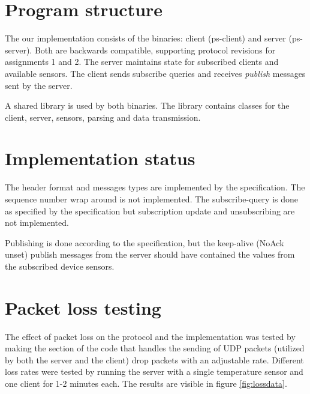 \documentclass[a4paper]{article}
\begin{document}


\tableofcontents
\newpage

\section{Program structure}
The our implementation consists of the binaries: client (ps-client) and server
(ps-server). Both are backwards compatible, supporting protocol revisions for
assignments 1 and 2. The server maintains state for subscribed clients and
available sensors. The client sends subscribe queries and receives \emph{publish}
messages sent by the server.

A shared library is used by both binaries. The library contains classes for
the client, server, sensors, parsing and data transmission.

\section{Implementation status}
The header format and messages types are implemented by the specification.
The sequence number wrap around is not implemented. The subscribe-query is done
as specified by the specification but subscription update and unsubscribing
are not implemented.

Publishing is done according to the specification, but the keep-alive (NoAck
unset) publish messages from the server should have contained the values from
the subscribed device sensors.


\section{Packet loss testing}

The effect of packet loss on the protocol and the implementation was tested by making the section of the code that handles the sending of UDP packets (utilized by both the server and the client) drop packets with an adjustable rate. Different loss rates were tested by running the server with a single temperature sensor and one client for 1-2 minutes each. The results are visible in figure \ref{fig:lossdata}.
\end{document}
